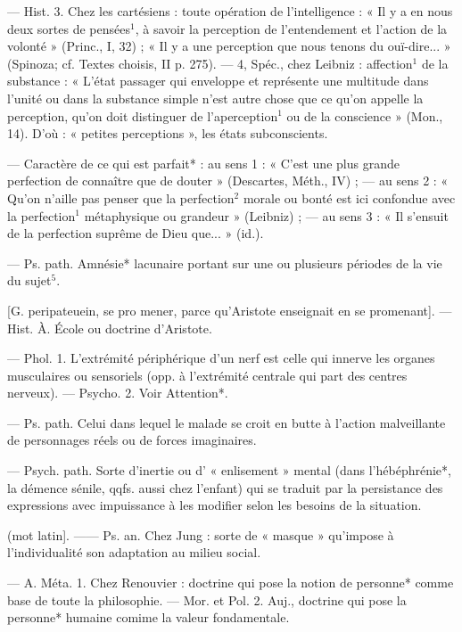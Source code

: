 \begin{itemize}[leftmargin=1cm, label=, itemsep=1pt]
— Hist. 3. Chez les cartésiens :
toute opération de l'intelligence :
« Il y a en nous deux sortes de pensées$^1$, à savoir la perception de l’entendement et l’action de la volonté »
(Princ., I, 32) ; « Il y a une perception que nous tenons du ouï-dire... »
(Spinoza; cf. Textes choisis, II
p. 275). — 4, Spéc., chez Leibniz :
affection$^1$ de la substance : « L'état
passager qui enveloppe et représente une multitude dans l’unité ou
dans la substance simple n’est autre
chose que ce qu’on appelle la perception, qu’on doit distinguer de
l’aperception$^1$ ou de la conscience »
(Mon., 14). D'où : « petites perceptions », les états subconscients.

 — Caractère de ce qui est
parfait* : au sens 1 : « C’est une plus
grande perfection de connaître que
de douter » (Descartes, Méth., IV) ;
— au sens 2 : « Qu'on n'aille pas
penser que la perfection$^2$ morale ou
bonté est ici confondue avec la perfection$^1$ métaphysique ou grandeur »
(Leibniz) ; — au sens 3 : « Il s'ensuit
de la perfection suprême de Dieu
que... » (id.).

 — Ps. path.
Amnésie* lacunaire portant sur une
ou plusieurs périodes de la vie du
sujet$^5$.

 [G. peripateuein, se pro
mener, parce qu’Aristote enseignait
en se promenant]. — Hist. À. École
ou doctrine d’Aristote.

 — Phol. 1. L’extrémité
périphérique d’un nerf est celle qui
innerve les organes musculaires ou
sensoriels (opp. à l'extrémité centrale
qui part des centres nerveux). —
Psycho. 2. Voir Attention*.

 — Ps. path.
Celui dans lequel le malade se croit
en butte à l’action malveillante de
personnages réels ou de forces imaginaires.

 — Psych. path. Sorte
d'inertie ou d’ « enlisement » mental
(dans l'hébéphrénie*, la démence
sénile, qqfs. aussi chez l'enfant) qui
se traduit par la persistance des
expressions avec impuissance à les
modifier selon les besoins de la situation.

 (mot latin]. —— Ps. an. Chez
Jung : sorte de « masque » qu'impose
à l’individualité son adaptation au
milieu social.

 — A. Méta. 1. Chez
Renouvier : doctrine qui pose la notion de personne* comme base de
toute la philosophie. — Mor. et Pol.
2. Auj., doctrine qui pose la personne* humaine comime la valeur
fondamentale.


\end{itemize}
